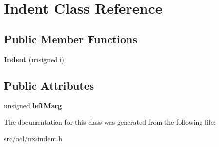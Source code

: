 \hypertarget{classIndent}{
\section{Indent Class Reference}
\label{classIndent}
}
\subsection*{Public Member Functions}
\begin{DoxyCompactItemize}
\item 
\hypertarget{classIndent_ab7229c22c53bcb875c80c3add138b6e9}{
{\bfseries Indent} (unsigned i)}
\label{classIndent_ab7229c22c53bcb875c80c3add138b6e9}

\end{DoxyCompactItemize}
\subsection*{Public Attributes}
\begin{DoxyCompactItemize}
\item 
\hypertarget{classIndent_a56bffbdb61889db4b9122bff33c7ceb4}{
unsigned {\bfseries leftMarg}}
\label{classIndent_a56bffbdb61889db4b9122bff33c7ceb4}

\end{DoxyCompactItemize}


The documentation for this class was generated from the following file:\begin{DoxyCompactItemize}
\item 
src/ncl/nxsindent.h\end{DoxyCompactItemize}
